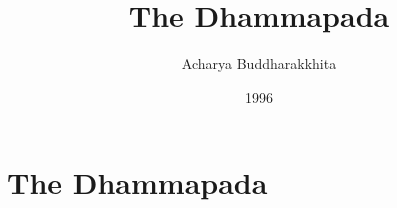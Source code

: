 \documentclass[twocolumn, oneside,12pt]{book}
\begin{document}
\title{The Dhammapada}
\author{Acharya Buddharakkhita}
\date{1996}
\maketitle
\onecolumn



\tableofcontents
\frontmatter


\mainmatter
\twocolumn
\part*{The Dhammapada}


























\backmatter
\onecolumn
\printglossaries
\end{document}
